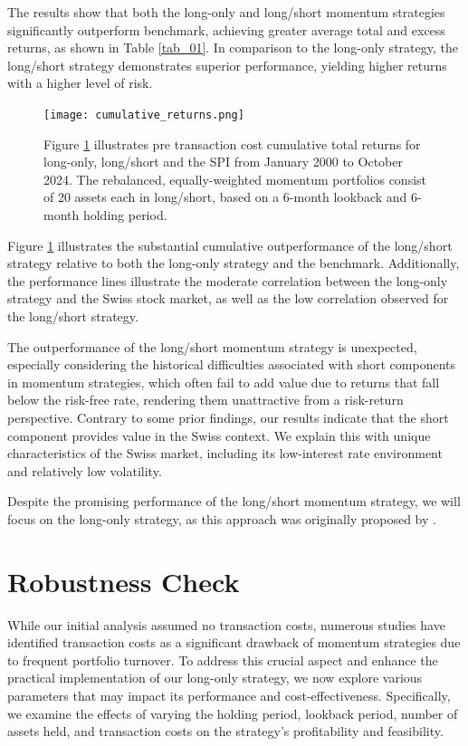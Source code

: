 \documentclass[a4paper,12pt]{article}
\begin{document}
    The results show that both the long-only and long/short momentum strategies significantly outperform benchmark, achieving greater average total and excess returns, as shown in Table \ref{tab_01}. In comparison to the long-only strategy, the long/short strategy demonstrates superior performance, yielding higher returns with a higher level of risk. 
    
    \begin{figure}[htbp]
    \centerline{\texttt{[image: cumulative\_returns.png]}}
    \caption{}
    \label{fig_01}
    \justifying
    \small{{Figure \ref{fig_01} illustrates pre transaction cost cumulative total returns for long-only, long/short and the SPI from January 2000 to October 2024. The rebalanced, equally-weighted momentum portfolios consist of 20 assets each in long/short, based on a 6-month lookback and 6-month holding period.}}
    \end{figure}
    
    Figure \ref{fig_01} illustrates the substantial cumulative outperformance of the long/short strategy relative to both the long-only strategy and the benchmark. Additionally, the performance lines illustrate the moderate correlation between the long-only strategy and the Swiss stock market, as well as the low correlation observed for the long/short strategy.
    
    The outperformance of the long/short momentum strategy is unexpected, especially considering the historical difficulties associated with short components in momentum strategies, which often fail to add value due to returns that fall below the risk-free rate, rendering them unattractive from a risk-return perspective. Contrary to some prior findings, our results indicate that the short component provides value in the Swiss context. We explain this with unique characteristics of the Swiss market, including its low-interest rate environment and relatively low volatility.
    
    Despite the promising performance of the long/short momentum strategy, we will focus on the long-only strategy, as this approach was originally proposed by \cite{jegatit1993}. 
    
    \newpage
    
    \section{Robustness Check}
    While our initial analysis assumed no transaction costs, numerous studies have identified transaction costs as a significant drawback of momentum strategies due to frequent portfolio turnover. To address this crucial aspect and enhance the practical implementation of our long-only strategy, we now explore various parameters that may impact its performance and cost-effectiveness. Specifically, we examine the effects of varying the holding period, lookback period, number of assets held, and transaction costs on the strategy's profitability and feasibility.
    
\end{document}
